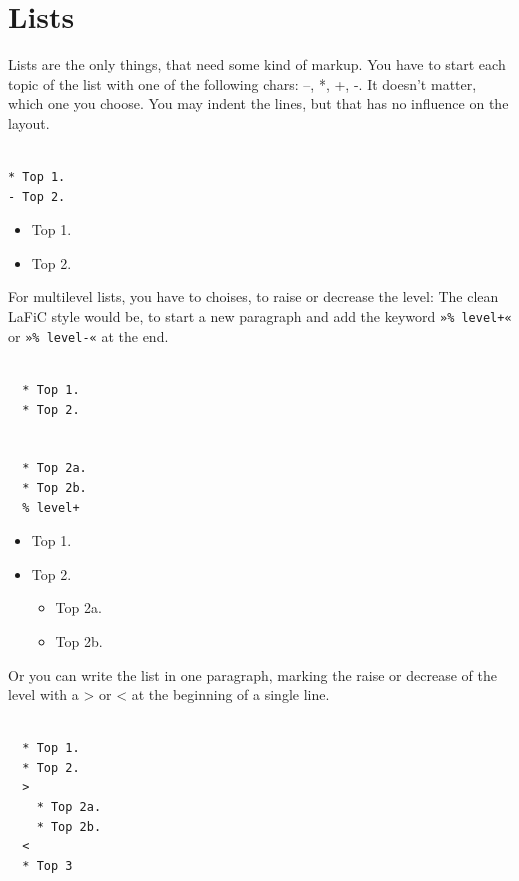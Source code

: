 \documentclass{article}
\begin{document}
\section{Lists}

{Lists are the only things, that need some kind of
markup. You have to start each topic of the list with one of
the following chars: –, *, +, -. It doesn't matter, which one you
choose. You may indent the lines, but that has no influence
on the layout.\\}

\begin{verbatim}

* Top 1.
- Top 2.
\end{verbatim}


\begin{itemize}
\item Top 1.
\item Top 2.
\end{itemize}


{For multilevel lists, you have to choises, to raise or
decrease the level: The clean LaFiC style would be,
to start a new paragraph and add the keyword \texttt{»\% level+«}
or \texttt{»\% level-«} at the end.\\}

\begin{verbatim}

  * Top 1.
  * Top 2.


  * Top 2a.
  * Top 2b.
  % level+
\end{verbatim}


\begin{itemize}
\item Top 1.
\item Top 2.

\begin{itemize}
\item Top 2a.
\item Top 2b.
\end{itemize}

\end{itemize}


{Or you can write the list in one paragraph, marking the
raise or decrease of the level with a > or < at the
beginning of a single line.\\}

\begin{verbatim}

  * Top 1.
  * Top 2.
  >
    * Top 2a.
    * Top 2b.
  <
  * Top 3
\end{verbatim}
\end{document}
